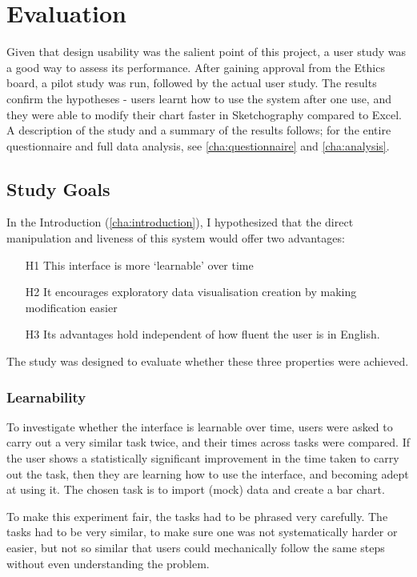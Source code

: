 \chapter{Evaluation}
Given that design usability was the salient point of this project, a user study was a good way to assess its performance. After gaining approval from the Ethics board, a pilot study was run, followed by the actual user study. The results confirm the hypotheses - users learnt how to use the system after one use, and they were able to modify their chart faster in Sketchography compared to Excel. A description of the study and a summary of the results follows; for the entire questionnaire and full data analysis, see \autoref{cha:questionnaire} and \autoref{cha:analysis}.

\section{Study Goals}
In the Introduction (\autoref{cha:introduction}), I hypothesized that the direct manipulation and liveness of this system would offer two advantages:

\begin{enumerate}
\item[H1] This interface is more `learnable' over time
\item[H2] It encourages exploratory data visualisation creation by making modification easier
\item[H3] Its advantages hold independent of how fluent the user is in English.
\end{enumerate}

The study was designed to evaluate whether these three properties were achieved. 

\subsection*{Learnability}
To investigate whether the interface is learnable over time, users were asked to carry out a very similar task twice, and their times across tasks were compared. If the user shows a statistically significant improvement in the time taken to carry out the task, then they are learning how to use the interface, and becoming adept at using it. The chosen task is to import (mock) data and create a bar chart.

To make this experiment fair, the tasks had to be phrased very carefully. The tasks had to be very similar, to make sure one was not systematically harder or easier, but not so similar that users could mechanically follow the same steps without even understanding the problem.

